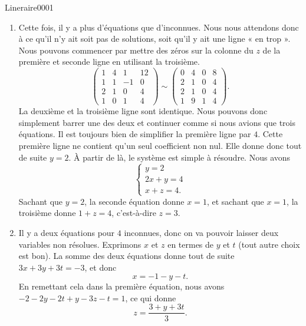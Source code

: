 \begin{corrige}{Lineraire0001}
\begin{enumerate}
\begin{equation}
\begin{array}{cccc|c}
					      0	&	0	&	1	&	3	&	1	
				      \end{array}\right).				      
			\end{equation}
			Sur cette dernière matrice, les solutions se lisent encore plus facilement.
		\item
			Cette fois, il y a plus d'équations que d'inconnues. Nous nous attendons donc à ce qu'il n'y ait soit pas de solutions, soit qu'il y ait une ligne « en trop ». Nous pouvons commencer par mettre des zéros sur la colonne du $z$ de la première et seconde ligne en utilisant la troisième.
			\begin{equation}
				\left(\begin{array}{ccc|c}
					1	&	4	&	1	&	12	\\	
					1	&	1	&	-1	&	0	\\	
						2	&	1	&	0	&	4	\\	
							1	&	0	&	1	&	4	
						\end{array}\right)
						\sim
				\left(\begin{array}{ccc|c}
					0	&	4	&	0	&	8	\\
					2	&	1	&	0	&	4\\
					2	&	1	&	0	&	4\\
					1	&	9	&	1	&	4
				\end{array}\right).
			\end{equation}
			La deuxième et la troisième ligne sont identique. Nous pouvons donc simplement barrer une des deux et continuer comme si nous avions que trois équations. Il est toujours bien de simplifier la première ligne par $4$. Cette première ligne ne contient qu'un seul coefficient non nul. Elle donne donc tout de suite $y=2$. À partir de là, le système est simple à résoudre. Nous avons
			\begin{equation}
				\left\{
				\begin{array}{ll}
					y=2\\
					2x+y=4\\
					x+z=4.
				\end{array}
				\right.
			\end{equation}
			Sachant que $y=2$, la seconde équation donne $x=1$, et sachant que $x=1$, la troisième donne $1+z=4$, c'est-à-dire $z=3$.

		\item
			Il y a deux équations pour $4$ inconnues, donc on va pouvoir laisser deux variables non résolues. Exprimons $x$ et $z$ en termes de $y$ et $t$ (tout autre choix est bon). La somme des deux équations donne tout de suite $3x+3y+3t=-3$, et donc
			\begin{equation}
				x=-1-y-t.
			\end{equation}
			En remettant cela dans la première équation, nous avons $-2-2y-2t+y-3z-t=1$, ce qui donne
			\begin{equation}
				z=\frac{ 3+y+3t }{ 3 }.
			\end{equation}
	\end{enumerate}

\end{corrige}
